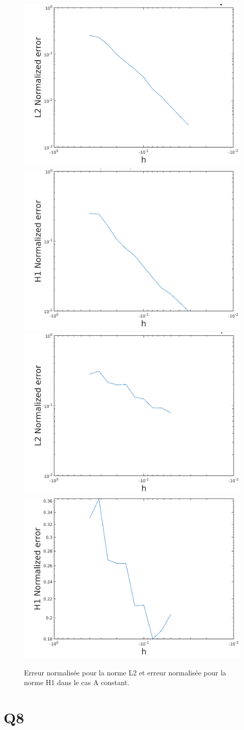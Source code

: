 \documentclass[11pt]{article}
\begin{document}
\begin{figure}
  \centering
  \includegraphics[width=.5\textwidth]{dirichlet/L2_Acst} 
  \includegraphics[width=.48\textwidth]{dirichlet/H1_Acst} \\
  \includegraphics[width=.48\textwidth]{dirichlet/L2_Avar} 
  \includegraphics[width=.48\textwidth]{dirichlet/H1_Avar}
  \caption{Erreur normalisée pour la norme L2 et erreur normalisée pour la norme H1 dans le cas A constant.}
  \label{fig:acst}
\end{figure}

\section{Q8}
\end{document}
